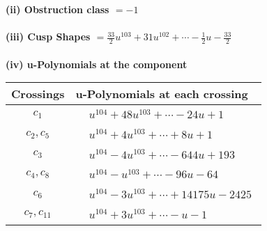 \documentclass[1p]{elsarticle_modified}
\theoremstyle{definition}
\begin{document}
\flushleft \textbf{(ii) Obstruction class $= -1$}\\~\\
\flushleft \textbf{(iii) Cusp Shapes $= \frac{33}{2} u^{103}+31 u^{102}+\cdots-\frac{1}{2} u-\frac{33}{2}$}\\~\\
\newpage\renewcommand{\arraystretch}{1}
\flushleft \textbf{(iv) u-Polynomials at the component}\newline \\
\begin{tabular}{m{50pt}|m{274pt}}
Crossings & \hspace{64pt}u-Polynomials at each crossing \\
\hline $$\begin{aligned}c_{1}\end{aligned}$$&$\begin{aligned}
&u^{104}+48 u^{103}+\cdots-24 u+1
\end{aligned}$\\
\hline $$\begin{aligned}c_{2},c_{5}\end{aligned}$$&$\begin{aligned}
&u^{104}+4 u^{103}+\cdots+8 u+1
\end{aligned}$\\
\hline $$\begin{aligned}c_{3}\end{aligned}$$&$\begin{aligned}
&u^{104}-4 u^{103}+\cdots-644 u+193
\end{aligned}$\\
\hline $$\begin{aligned}c_{4},c_{8}\end{aligned}$$&$\begin{aligned}
&u^{104}- u^{103}+\cdots-96 u-64
\end{aligned}$\\
\hline $$\begin{aligned}c_{6}\end{aligned}$$&$\begin{aligned}
&u^{104}-3 u^{103}+\cdots+14175 u-2425
\end{aligned}$\\
\hline $$\begin{aligned}c_{7},c_{11}\end{aligned}$$&$\begin{aligned}
&u^{104}+3 u^{103}+\cdots- u-1
\end{aligned}$\\

\end{tabular}
\end{document}
